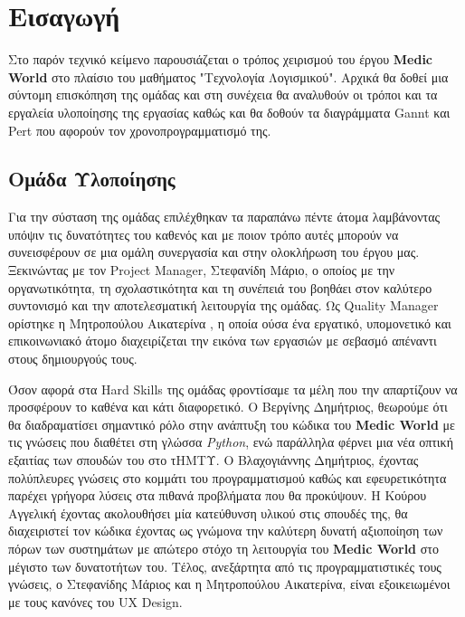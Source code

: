 \documentclass{article}
\begin{document}
{
  \hypersetup{linkcolor=black}
  \tableofcontents
}

\section{Εισαγωγή}
   
Στο παρόν τεχνικό κείμενο παρουσιάζεται ο τρόπος χειρισμού του έργου \textbf{Medic World} στο πλαίσιο του μαθήματος "Τεχνολογία Λογισμικού". Αρχικά θα δοθεί μια σύντομη επισκόπηση της ομάδας και στη συνέχεια θα αναλυθούν οι τρόποι και τα εργαλεία υλοποίησης της εργασίας καθώς και θα δοθούν τα διαγράμματα Gannt και Pert που αφορούν τον χρονοπρογραμματισμό της. 
 
 
\subsection{Ομάδα Υλοποίησης}

Για την σύσταση της ομάδας επιλέχθηκαν τα παραπάνω πέντε άτομα λαμβάνοντας υπόψιν τις δυνατότητες του καθενός και με ποιον τρόπο αυτές μπορούν να συνεισφέρουν σε μια ομάλη συνεργασία και στην ολοκλήρωση του έργου μας. Ξεκινώντας με τον Project Manager, Στεφανίδη Μάριο, ο οποίος με την οργανωτικότητα, τη σχολαστικότητα και τη συνέπειά του βοηθάει στον καλύτερο συντονισμό και την αποτελεσματική λειτουργία της ομάδας. Ως Quality Manager ορίστηκε η Μητροπούλου Αικατερίνα , η οποία ούσα ένα εργατικό, υπομονετικό και επικοινωνιακό άτομο διαχειρίζεται την εικόνα των εργασιών με σεβασμό απέναντι στους δημιουργούς τους.
\newline \par

Όσον αφορά στα Hard Skills της ομάδας φροντίσαμε τα μέλη που την απαρτίζουν να προσφέρουν το καθένα και κάτι διαφορετικό. Ο Βεργίνης Δημήτριος, θεωρούμε ότι θα διαδραματίσει σημαντικό ρόλο στην ανάπτυξη του κώδικα του \textbf{Medic World} με τις γνώσεις που διαθέτει στη γλώσσα \emph{Python}, ενώ παράλληλα φέρνει μια νέα οπτική εξαιτίας των σπουδών του στο τΗΜΤΥ. Ο Βλαχογιάννης Δημήτριος, έχοντας πολύπλευρες γνώσεις στο κομμάτι του προγραμματισμού καθώς και εφευρετικότητα παρέχει γρήγορα λύσεις στα πιθανά προβλήματα που θα προκύψουν. Η Κούρου Αγγελική έχοντας ακολουθήσει μία κατεύθυνση υλικού στις σπουδές της, θα διαχειριστεί τον κώδικα έχοντας ως γνώμονα την καλύτερη δυνατή αξιοποίηση των πόρων των συστημάτων με απώτερο στόχο τη λειτουργία του \textbf{Medic World} στο μέγιστο των δυνατοτήτων του. Τέλος, ανεξάρτητα από τις προγραμματιστικές τους γνώσεις, ο Στεφανίδης Μάριος και η Μητροπούλου Αικατερίνα, είναι εξοικειωμένοι με τους κανόνες του UX Design.
\end{document}
